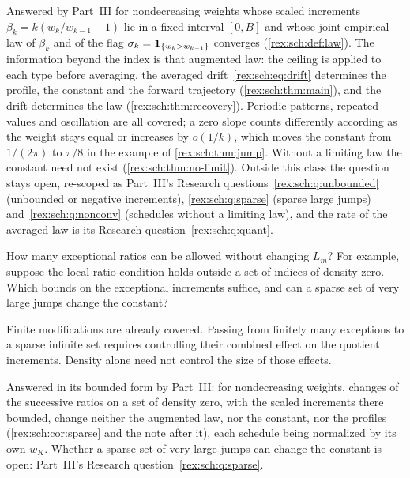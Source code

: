 \begin{writenote}
Answered by Part~III for nondecreasing weights whose scaled increments
$\beta_k=k(w_k/w_{k-1}-1)$ lie in a fixed interval $[0,B]$ and whose joint
empirical law of $\beta_k$ and of the flag $\sigma_k=\mathbf 1_{\{w_k>w_{k-1}\}}$
converges (\cref{rex:sch:def:law}). The information beyond the index is that
augmented law: the ceiling is applied to each type before averaging, the
averaged drift~\eqref{rex:sch:eq:drift} determines the profile, the
constant and the forward trajectory (\cref{rex:sch:thm:main}), and the drift
determines the law (\cref{rex:sch:thm:recovery}). Periodic patterns, repeated
values and oscillation are all covered; a zero slope counts differently
according as the weight stays equal or increases by $o(1/k)$, which moves the
constant from $1/(2\pi)$ to $\pi/8$ in the example of
\cref{rex:sch:thm:jump}. Without a limiting law the constant need not exist
(\cref{rex:sch:thm:no-limit}). Outside this class the question stays open,
re-scoped as Part~III's Research questions~\ref{rex:sch:q:unbounded}
(unbounded or negative increments), \ref{rex:sch:q:sparse} (sparse large
jumps) and~\ref{rex:sch:q:nonconv} (schedules without a limiting law), and
the rate of the averaged law is its Research question~\ref{rex:sch:q:quant}.
\end{writenote}

\begin{question}\label{rex:q:sparse}
How many exceptional ratios can be allowed without changing $L_m$?
For example, suppose the local ratio condition holds outside a set
of indices of density zero. Which bounds on the exceptional
increments suffice, and can a sparse set of very large jumps change
the constant?
\end{question}

Finite modifications are already covered. Passing from finitely many
exceptions to a sparse infinite set requires controlling their
combined effect on the quotient increments. Density alone need not
control the size of those effects.

\begin{writenote}
Answered in its bounded form by Part~III: for nondecreasing weights,
changes of the successive ratios on a set of density zero, with the scaled
increments there bounded, change neither the augmented law, nor the
constant, nor the profiles (\cref{rex:sch:cor:sparse} and the note after
it), each schedule being normalized by its own $w_K$. Whether a sparse set
of very large jumps can change the constant is open: Part~III's Research
question~\ref{rex:sch:q:sparse}.
\end{writenote}

